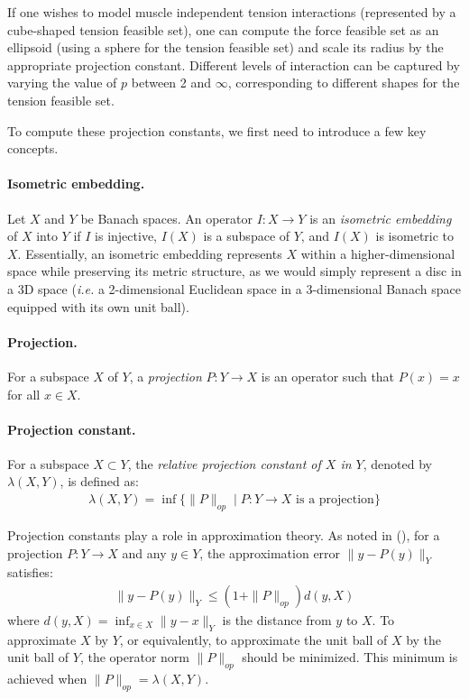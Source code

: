 If one wishes to model muscle independent tension interactions (represented by a cube-shaped tension feasible set), one can compute the force feasible set as an ellipsoid (using a sphere for the tension feasible set) and scale its radius by the appropriate projection constant. Different levels of interaction can be captured by varying the value of $p$ between 2 and $\infty$, corresponding to different shapes for the tension feasible set.

To compute these projection constants, we first need to introduce a few key concepts.

\paragraph*{Isometric embedding.} Let $X$ and $Y$ be Banach spaces. An operator $I: X \rightarrow Y$ is an \emph{isometric embedding} of $X$ into $Y$ if $I$ is injective, $I(X)$ is a subspace of $Y$, and $I(X)$ is isometric to $X$.  Essentially, an isometric embedding represents $X$ within a higher-dimensional space while preserving its metric structure, as we would simply represent a disc in a 3D space (\emph{i.e.} a 2-dimensional Euclidean space in a 3-dimensional Banach space equipped with its own unit ball).

\paragraph*{Projection.} For a subspace $X$ of $Y$, a \emph{projection} $P: Y \rightarrow X$ is an operator such that $P(x) = x$ for all $x \in X$.

\paragraph*{Projection constant.} For a subspace $X \subset Y$, the \emph{relative projection constant of $X$ in $Y$}, denoted by $\lambda(X, Y)$, is defined as:
\begin{align*}
\lambda(X, Y) = \inf\{\|P\|_{op} \mid P: Y \rightarrow X \text{ is a projection}\}
\end{align*}

Projection constants play a role in approximation theory. As noted in (\cite{defantProjectionConstantsSpaces2022}), for a projection $P: Y \rightarrow X$ and any $y \in Y$, the approximation error $\|y - P(y)\|_Y$ satisfies:
\begin{align*}
\|y - P(y)\|_Y \leq (1 + \|P\|_{op}) d(y, X)
\end{align*}
where $d(y, X) = \inf_{x \in X} \|y - x\|_Y$ is the distance from $y$ to $X$. To approximate $X$ by $Y$, or equivalently, to approximate the unit ball of $X$ by the unit ball of $Y$, the operator norm $\|P\|_{op}$ should be minimized. This minimum is achieved when $\|P\|_{op} = \lambda(X, Y)$.

